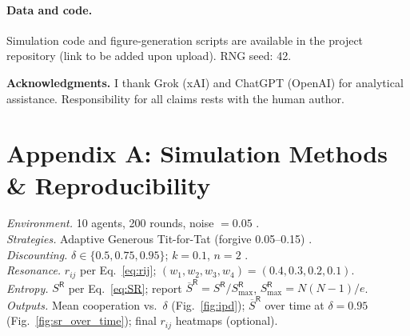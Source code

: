 \documentclass[11pt]{article}
\newcommand{\SR}{S^{\mathsf{R}}}
\newcommand{\SRbar}{\overline{S}^{\mathsf{R}}}
\begin{document}
\paragraph{Data and code.} Simulation code and figure-generation scripts are available in the project repository (link to be added upon upload). RNG seed: 42.

\bigskip
\noindent\textbf{Acknowledgments.} I thank Grok (xAI) and ChatGPT (OpenAI) for analytical assistance. Responsibility for all claims rests with the human author.

\appendix
\section*{Appendix A: Simulation Methods \& Reproducibility}
\emph{Environment.} 10 agents, 200 rounds, noise $=0.05$ \citep{Axelrod1984,Nowak2006}.\\
\emph{Strategies.} Adaptive Generous Tit-for-Tat (forgive 0.05--0.15) \citep{Nowak2006,Santos2018}.\\
\emph{Discounting.} $\delta\in\{0.5,0.75,0.95\}$; $k\!=\!0.1$, $n\!=\!2$ \citep{Ainslie1975,Frederick2002}.\\
\emph{Resonance.} $r_{ij}$ per Eq.~\ref{eq:rij}; $(w_1,w_2,w_3,w_4)=(0.4,0.3,0.2,0.1)$.\\
\emph{Entropy.} $\SR$ per Eq.~\ref{eq:SR}; report $\SRbar=\SR/\SR_{\max}$, $\SR_{\max}=N(N-1)/e$.\\
\emph{Outputs.} Mean cooperation vs.\ $\delta$ (Fig.~\ref{fig:ipd}); $\SRbar$ over time at $\delta\!=\!0.95$ (Fig.~\ref{fig:sr_over_time}); final $r_{ij}$ heatmaps (optional).

\end{document}
